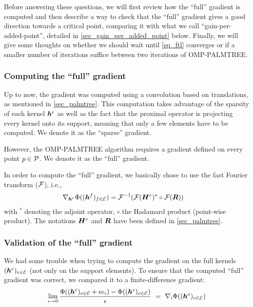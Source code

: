 \noindent
Before answering these questions, we will first review how the “full” gradient is computed and then describe a way to check that the “full” gradient gives a good direction towards a critical point, comparing it with what we call “gain-per-added-point”, detailed in \cref{sec_gain_per_added_point} below. Finally, we will give some thoughts on whether we should wait until \eqref{eq_ftl} converges or if a smaller number of iterations suffice between two iterations of OMP-PALMTREE.


\subsubsection{Computing the “full” gradient}\label{sec_full_grad}
Up to now, the gradient was computed using a convolution based on translations, as mentioned in \cref{sec_palmtree}. This computation takes advantage of the sparsity of each kernel $\h^e$ as well as the fact that the proximal operator is projecting every kernel onto its support, meaning that only a few elements have to be computed. We denote it as the “sparse” gradient.

\noindent
However, the OMP-PALMTREE algorithm requires a gradient defined on every point $p \in \P$. We denote it as the “full” gradient.

\noindent
In order to compute the “full” gradient, we basically chose to use the fast Fourier transform ($\F$), i.e., 
\begin{align*}
	\nabla_{\h^e} \Phi((\h^f)_{f \in \E})&= \F^{-1}(\F(\H^{e})^* \circ \F(\Res))
\end{align*}
with ${}^*$ denoting the adjoint operator, $\circ$ the Hadamard product (point-wise product). The notations $\H^e$ and $\Res$ have been defined in \cref{sec_palmtree}.

\subsubsection{Validation of the “full” gradient}
We had some trouble when trying to compute the gradient on the full kernels $(\h^e)_{e \in \E}$ (not only on the support elements). To ensure that the computed “full” gradient was correct, we compared it to a finite-difference gradient:
\begin{equation*}\lim_{\epsilon \rightarrow 0} \frac{\Phi((\h^e)_{e \in \E}+\epsilon e_i) - \Phi ((\h^e)_{e \in \E}) }{\epsilon} ~=~ \nabla_i \Phi ((\h^e)_{e \in \E})\end{equation*}


